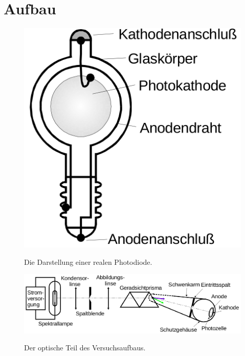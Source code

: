 \section{Aufbau}
\label{sec:Aufbau}

\begin{figure}
	\centering
	\caption{Die Darstellung einer realen Photodiode.}
	\includegraphics[width=\linewidth-280pt,height=\textheight-280pt,keepaspectratio]{content/Bilder/Photodiodereal.png}
	\label{fig:photodiodereal}
\end{figure}
\begin{figure}
	\centering
	\caption{Der optische Teil des Versuchsaufbaus.}
	\includegraphics[width=\linewidth-70pt,height=\textheight-70pt,keepaspectratio]{content/Bilder/Optikteil.png}
	\label{fig:optikteil}
\end{figure}
